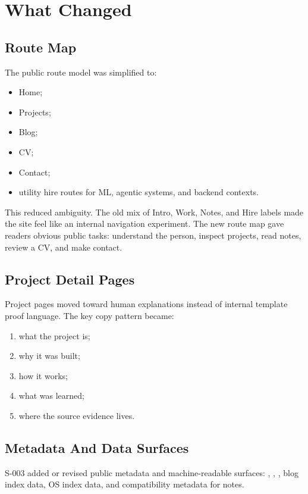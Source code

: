 \documentclass[a4paper,11pt,openany]{report}
\begin{document}
\chapter{What Changed}

\section{Route Map}

The public route model was simplified to:

\begin{itemize}
  \item Home;
  \item Projects;
  \item Blog;
  \item CV;
  \item Contact;
  \item utility hire routes for ML, agentic systems, and backend contexts.
\end{itemize}

This reduced ambiguity. The old mix of Intro, Work, Notes, and Hire labels made
the site feel like an internal navigation experiment. The new route map gave
readers obvious public tasks: understand the person, inspect projects, read
notes, review a CV, and make contact.

\section{Project Detail Pages}

Project pages moved toward human explanations instead of internal template
proof language. The key copy pattern became:

\begin{enumerate}
  \item what the project is;
  \item why it was built;
  \item how it works;
  \item what was learned;
  \item where the source evidence lives.
\end{enumerate}

\section{Metadata And Data Surfaces}

S-003 added or revised public metadata and machine-readable surfaces:
, ,
, blog index data, OS index data, and compatibility
metadata for notes.
\end{document}
